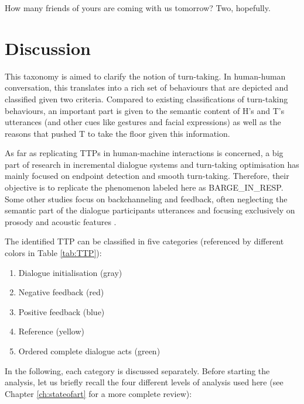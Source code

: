                     	\begin{dialogue}
							 How many friends of yours are coming with us tomorrow?
							 Two, hopefully.
						\end{dialogue}

\section{Discussion}

	This taxonomy is aimed to clarify the notion of turn-taking. In human-human conversation, this translates into a rich set of behaviours that are depicted and classified given two criteria. Compared to existing classifications of turn-taking behaviours, an important part is given to the semantic content of H's and T's utterances (and other cues like gestures and facial expressions) as well as the reasons that pushed T to take the floor given this information.

    As far as replicating TTPs in human-machine interactions is concerned, a big part of research in incremental dialogue systems and turn-taking optimisation has mainly focused on endpoint detection \cite{Raux2008} and smooth turn-taking. Therefore, their objective is to replicate the phenomenon labeled here as BARGE\_IN\_RESP. Some other studies focus on backchanneling and feedback, often neglecting the semantic part of the dialogue participants utterances and focusing exclusively on prosody and acoustic features \cite{Baumann2008,Jonsdottir2008}.

    The identified TTP can be classified in five categories (referenced by different colors in Table \ref{tab:TTP}):
    
    \begin{enumerate}
      \item Dialogue initialisation (gray)
      \item Negative feedback (red)
      \item Positive feedback (blue)
      \item Reference (yellow)
      \item Ordered complete dialogue acts (green)
    \end{enumerate}

    In the following, each category is discussed separately. Before starting the analysis, let us briefly recall the four different levels of analysis used here (see Chapter \ref{ch:stateofart} for a more complete review):
		
